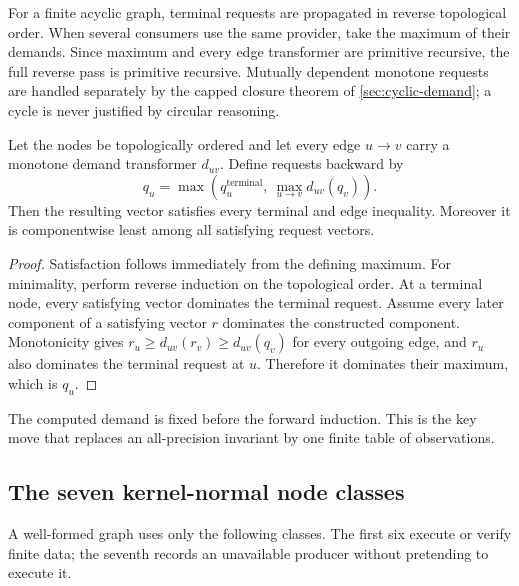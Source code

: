 For a finite acyclic graph, terminal requests are propagated in reverse topological order.  When several consumers use the same provider, take the maximum of their demands.  Since maximum and every edge transformer are primitive recursive, the full reverse pass is primitive recursive.  Mutually dependent monotone requests are handled separately by the capped closure theorem of \cref{sec:cyclic-demand}; a cycle is never justified by circular reasoning.

\begin{lemma}\label{lem:demand-least}
Let the nodes be topologically ordered and let every edge \(u\to v\) carry a monotone demand transformer \(d_{uv}\).  Define requests backward by
\[
 q_u=\max\left(q_u^{\mathrm{terminal}},\ \max_{u\to v}d_{uv}(q_v)\right).
\]
Then the resulting vector satisfies every terminal and edge inequality.  Moreover it is componentwise least among all satisfying request vectors.
\end{lemma}

\begin{proof}
Satisfaction follows immediately from the defining maximum.  For minimality, perform reverse induction on the topological order.  At a terminal node, every satisfying vector dominates the terminal request.  Assume every later component of a satisfying vector \(r\) dominates the constructed component.  Monotonicity gives
\(r_u\ge d_{uv}(r_v)\ge d_{uv}(q_v)\) for every outgoing edge, and \(r_u\) also dominates the terminal request at \(u\).  Therefore it dominates their maximum, which is \(q_u\).
\end{proof}

The computed demand is fixed before the forward induction.  This is the key move that replaces an all-precision invariant by one finite table of observations.

\subsection{The seven kernel-normal node classes}

A well-formed \KIFCR graph uses only the following classes.  The first six execute or verify finite data; the seventh records an unavailable producer without pretending to execute it.

